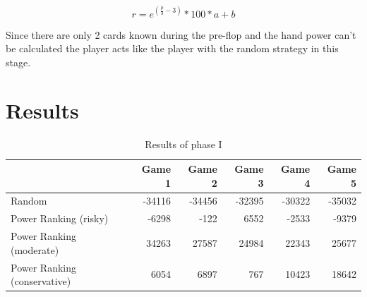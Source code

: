 \begin{equation}
	\label{equ:powerranking}
	r = e^{(\frac{p}{3} - 3)} * 100 * a + b
\end{equation}

Since there are only 2 cards known during the pre-flop and the hand power can't be calculated the player acts like the player with the random strategy in this stage.

\section{Results}
\begin{table}[h]
	\centering
	\begin{tabular}[h]{l|r|r|r|r|r}
		& \textbf{Game 1} & \textbf{Game 2} & \textbf{Game 3} & \textbf{Game 4} & \textbf{Game 5}\\
		\hline
		Random & -34116 & -34456 & -32395 & -30322 & -35032\\
		Power Ranking (risky) & -6298 & -122 & 6552 & -2533 & -9379\\
		Power Ranking (moderate) & 34263 & 27587 & 24984 & 22343 & 25677\\
		Power Ranking (conservative) & 6054 & 6897 & 767 & 10423 & 18642\\
	\end{tabular}
	\label{tbl:resultsPhase1}
	\caption{Results of phase I}
\end{table}


















